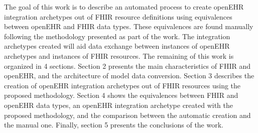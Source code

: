 The goal of this work is to describe an automated process to create openEHR integration archetypes out of FHIR resource definitions using equivalences between open\-EHR and FHIR data types. These equivalences are found manually following the methodology presented as part of the work. The integration archetypes created will aid data exchange between instances of openEHR archetypes and instances of FHIR resources. The remaining of this work is organized in 4 sections. Section 2 presents the main characteristics of FHIR and openEHR, and the architecture of model data conversion. Section 3 describes the creation of openEHR integration archetypes out of FHIR resources using the proposed methodology. Section 4 shows the equivalences between FHIR and openEHR data types, an openEHR integration archetype created with the proposed methodology, and the comparison between the automatic creation and the manual one. Finally, section 5 presents the conclusions of the work.
